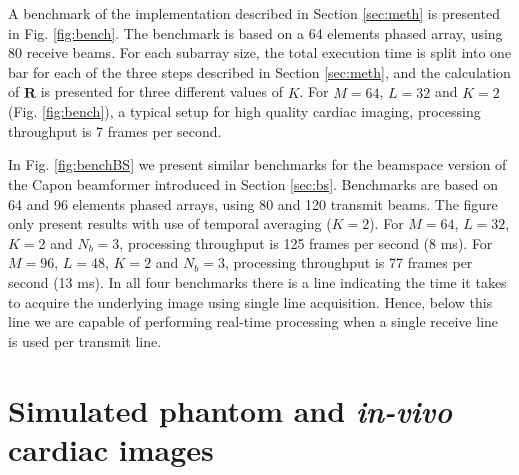 \documentclass[journal]{IEEEtran}
\newcommand{\mat}[1]{\mathbf{#1}}
\begin{document}
A benchmark of the implementation described in Section \ref{sec:meth} is presented in Fig. \ref{fig:bench}. The benchmark is based on a 64 elements phased array, using 80 receive beams. For each subarray size, the total execution time is split into one bar for each of the three steps described in Section \ref{sec:meth}, and the calculation of $\mat{\hat{R}}$ is presented for three different values of $K$. For $M=64$, $L=32$ and $K=2$ (Fig. \ref{fig:bench}), a typical setup for high quality cardiac imaging, processing throughput is 7 frames per second.

In Fig. \ref{fig:benchBS} we present similar benchmarks for the beamspace version of the Capon beamformer introduced in Section \ref{sec:bs}. Benchmarks are based on 64 and 96 elements phased arrays, using 80 and 120 transmit beams. The figure only present results with use of temporal averaging ($K=2$). For $M=64$, $L=32$, $K=2$ and $N_b=3$, processing throughput is 125 frames per second (8 ms). For $M=96$, $L=48$, $K=2$ and $N_b=3$, processing throughput is 77 frames per second (13 ms). In all four benchmarks there is a line indicating the time it takes to acquire the underlying image using single line acquisition. Hence, below this line we are capable of performing real-time processing when a single receive line is used per transmit line.

\section{Simulated phantom and \textit{in-vivo} cardiac images}\label{sec:images}
\end{document}
